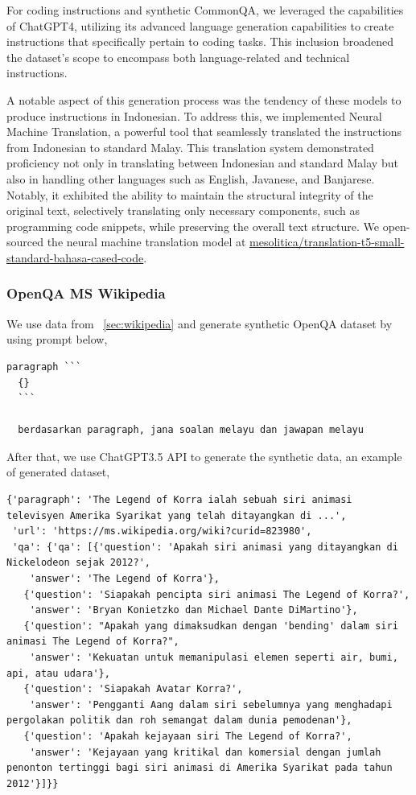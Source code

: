 \documentclass{article}
\begin{document}
For coding instructions and synthetic CommonQA, we leveraged the capabilities of ChatGPT4, utilizing its advanced language generation capabilities to create instructions that specifically pertain to coding tasks. This inclusion broadened the dataset's scope to encompass both language-related and technical instructions.

A notable aspect of this generation process was the tendency of these models to produce instructions in Indonesian. To address this, we implemented Neural Machine Translation, a powerful tool that seamlessly translated the instructions from Indonesian to standard Malay. This translation system demonstrated proficiency not only in translating between Indonesian and standard Malay but also in handling other languages such as English, Javanese, and Banjarese. Notably, it exhibited the ability to maintain the structural integrity of the original text, selectively translating only necessary components, such as programming code snippets, while preserving the overall text structure. We open-sourced the neural machine translation model at \href{https://huggingface.co/mesolitica/translation-t5-small-standard-bahasa-cased-code}{mesolitica/translation-t5-small-standard-bahasa-cased-code}.

\subsubsection{OpenQA MS Wikipedia}

We use data from ~\ref{sec:wikipedia} and generate synthetic OpenQA dataset by using prompt below,

\begin{lstlisting}[]
  paragraph ```
  {}
  ```
  
  berdasarkan paragraph, jana soalan melayu dan jawapan melayu
\end{lstlisting}

After that, we use ChatGPT3.5 API to generate the synthetic data, an example of generated dataset,

\begin{lstlisting}[]
  {'paragraph': 'The Legend of Korra ialah sebuah siri animasi televisyen Amerika Syarikat yang telah ditayangkan di ...',
 'url': 'https://ms.wikipedia.org/wiki?curid=823980',
 'qa': {'qa': [{'question': 'Apakah siri animasi yang ditayangkan di Nickelodeon sejak 2012?',
    'answer': 'The Legend of Korra'},
   {'question': 'Siapakah pencipta siri animasi The Legend of Korra?',
    'answer': 'Bryan Konietzko dan Michael Dante DiMartino'},
   {'question': "Apakah yang dimaksudkan dengan 'bending' dalam siri animasi The Legend of Korra?",
    'answer': 'Kekuatan untuk memanipulasi elemen seperti air, bumi, api, atau udara'},
   {'question': 'Siapakah Avatar Korra?',
    'answer': 'Pengganti Aang dalam siri sebelumnya yang menghadapi pergolakan politik dan roh semangat dalam dunia pemodenan'},
   {'question': 'Apakah kejayaan siri The Legend of Korra?',
    'answer': 'Kejayaan yang kritikal dan komersial dengan jumlah penonton tertinggi bagi siri animasi di Amerika Syarikat pada tahun 2012'}]}}
    
\end{lstlisting}
\end{document}
